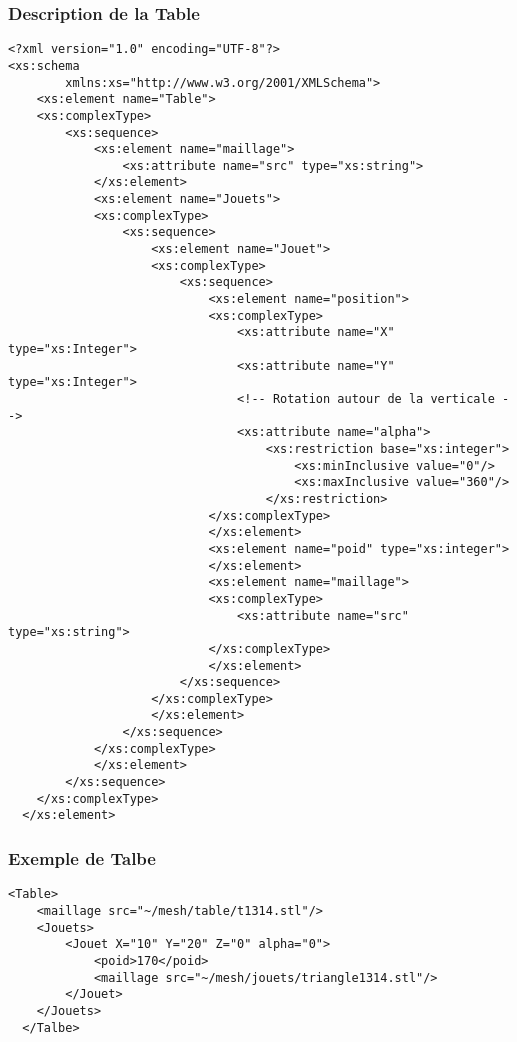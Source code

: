 \subsubsection{Description de la Table}
 \begin{lstlisting}[caption=Description de la Table, label=desctable]
<?xml version="1.0" encoding="UTF-8"?>
<xs:schema
        xmlns:xs="http://www.w3.org/2001/XMLSchema">
    <xs:element name="Table">
    <xs:complexType>
        <xs:sequence>
            <xs:element name="maillage">
                <xs:attribute name="src" type="xs:string">
            </xs:element>
            <xs:element name="Jouets">
            <xs:complexType>
                <xs:sequence>
                    <xs:element name="Jouet">
                    <xs:complexType>
                        <xs:sequence>
                            <xs:element name="position">
                            <xs:complexType>
                                <xs:attribute name="X" type="xs:Integer">
                                <xs:attribute name="Y" type="xs:Integer">
                                <!-- Rotation autour de la verticale -->
                                <xs:attribute name="alpha">
                                    <xs:restriction base="xs:integer">
                                        <xs:minInclusive value="0"/>
                                        <xs:maxInclusive value="360"/>
                                    </xs:restriction> 
                            </xs:complexType>
                            </xs:element>
                            <xs:element name="poid" type="xs:integer">
                            </xs:element>
                            <xs:element name="maillage">
                            <xs:complexType>
                                <xs:attribute name="src" type="xs:string">
                            </xs:complexType>
                            </xs:element>
                        </xs:sequence>
                    </xs:complexType>
                    </xs:element>
                </xs:sequence>
            </xs:complexType>
            </xs:element>
        </xs:sequence>
    </xs:complexType>
  </xs:element>
  \end{lstlisting}
  
\subsubsection{Exemple de Talbe}
  \begin{lstlisting}[caption=Description de la Table, label=desctable]
  <Table>
	<maillage src="~/mesh/table/t1314.stl"/>
	<Jouets>
		<Jouet X="10" Y="20" Z="0" alpha="0">
			<poid>170</poid>
			<maillage src="~/mesh/jouets/triangle1314.stl"/>
		</Jouet>
	</Jouets>
  </Talbe>
  \end{lstlisting}
